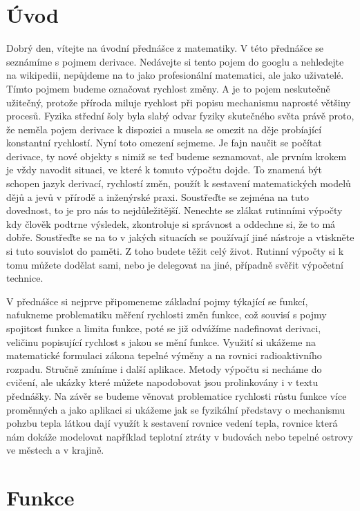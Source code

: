 \documentclass[12pt]{article}
\begin{document}
\section*{Úvod}

Dobrý den, vítejte na úvodní přednášce z matematiky. V této přednášce se seznámíme s pojmem derivace. Nedávejte si tento pojem do googlu a nehledejte na wikipedii, nepůjdeme na to jako profesionální matematici, ale jako uživatelé. Tímto pojmem budeme označovat rychlost změny. A je to pojem neskutečně užitečný, protože příroda miluje rychlost při popisu mechanismu naprosté většiny procesů. Fyzika střední šoly byla slabý odvar fyziky skutečného světa právě proto, že neměla pojem derivace k dispozici a musela se omezit na děje probíající konstantní rychlostí. Nyní toto omezení sejmeme. Je fajn naučit se počítat derivace, ty nové objekty s nimiž se teď budeme seznamovat, ale prvním krokem je vždy navodit situaci, ve které k tomuto výpočtu dojde. To znamená být schopen jazyk derivací, rychlostí změn, použít k sestavení matematických modelů dějů a jevů v přírodě a inženýrské praxi. Soustřeďte se zejména na tuto dovednost, to je pro nás to nejdůležitější. Nenechte se zlákat rutinními výpočty kdy člověk podtrne výsledek, zkontroluje si správnost a oddechne si, že to má dobře. Soustřeďte se na to v jakých situacích se používají jiné nástroje a vtiskněte si tuto souvislot do paměti. Z toho budete těžit celý život. Rutinní výpočty si k tomu můžete dodělat sami, nebo je delegovat na jiné, případně svěřit výpočetní technice.

V přednášce si nejprve připomeneme základní pojmy týkající se funkcí, naťukneme problematiku měření rychlosti změn funkce, což souvisí s pojmy spojitost funkce  a limita funkce, poté se již odvážíme nadefinovat derivaci, veličinu popisující rychlost s jakou se mění funkce. Využití si ukážeme na matematické formulaci zákona tepelné výměny a na rovnici radioaktivního rozpadu. Stručně zmíníme i další aplikace. Metody výpočtu si necháme do cvičení, ale ukázky které můžete napodobovat jsou prolinkovány i v textu přednášky. Na závěr se budeme věnovat problematice rychlosti růstu funkce více proměnných a jako aplikaci si ukážeme jak se fyzikální představy o mechanismu pohzbu tepla látkou dají využít k sestavení rovnice vedení tepla, rovnice která nám dokáže modelovat například teplotní ztráty v budovách nebo tepelné ostrovy ve městech a v krajině. 

\section*{Funkce}
\end{document}

